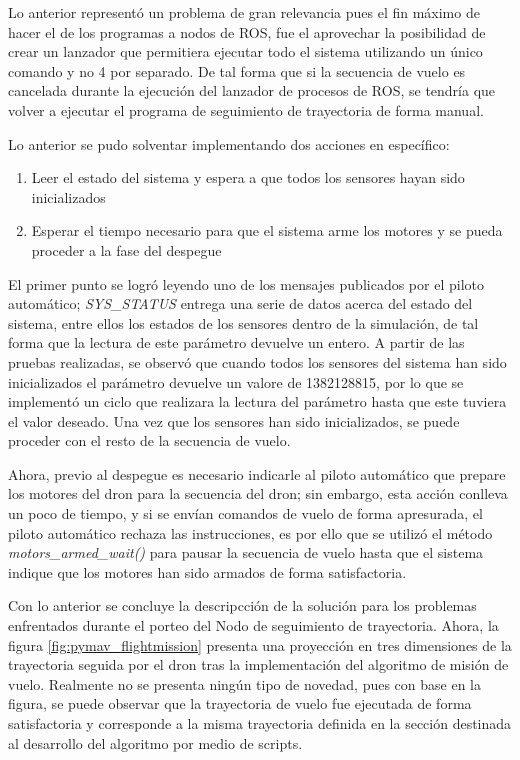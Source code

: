 Lo anterior representó un problema de gran relevancia pues el fin máximo de hacer el de los programas a nodos de ROS, fue el aprovechar la posibilidad de crear un lanzador que permitiera ejecutar todo el sistema utilizando un único comando y no 4 por separado. De tal forma que si la secuencia de vuelo es cancelada durante la ejecución del lanzador de procesos de ROS, se tendría que volver a ejecutar el programa de seguimiento de trayectoria de forma manual.

Lo anterior se pudo solventar implementando dos acciones en específico:

\begin{enumerate}
    \item Leer el estado del sistema y espera a que todos los sensores hayan sido inicializados
    \item Esperar el tiempo necesario para que el sistema arme los motores y se pueda proceder a la fase del despegue
\end{enumerate}

El primer punto se logró leyendo uno de los mensajes publicados por el piloto automático; \textit{SYS\_STATUS} entrega una serie de datos acerca del estado del sistema, entre ellos los estados de los sensores dentro de la simulación, de tal forma que la lectura de este parámetro devuelve un entero. A partir de las pruebas realizadas, se observó que cuando todos los sensores del sistema han sido inicializados el parámetro devuelve un valore de 1382128815, por lo que se implementó un ciclo que realizara la lectura del parámetro hasta que este tuviera el valor deseado. Una vez que los sensores han sido inicializados, se puede proceder con el resto de la secuencia de vuelo.

Ahora, previo al despegue es necesario indicarle al piloto automático que prepare los motores del dron para la secuencia del dron; sin embargo, esta acción conlleva un poco de tiempo, y si se envían comandos de vuelo de forma apresurada, el piloto automático rechaza las instrucciones, es por ello que se utilizó el método \textit{motors\_armed\_wait()} para pausar la secuencia de vuelo hasta que el sistema indique que los motores han sido armados de forma satisfactoria.

Con lo anterior se concluye la descripcción de la solución para los problemas enfrentados durante el porteo del Nodo de seguimiento de trayectoria. Ahora, la figura \ref{fig:pymav_flightmission} presenta una proyección en tres dimensiones de la trayectoria seguida por el dron tras la implementación del algoritmo de misión de vuelo. Realmente no se presenta ningún tipo de novedad, pues con base en la figura, se puede observar que la trayectoria de vuelo fue ejecutada de forma satisfactoria y corresponde a la misma trayectoria definida en la sección destinada al desarrollo del algoritmo por medio de scripts.

